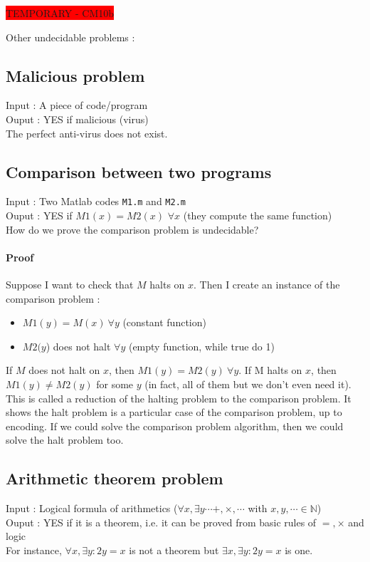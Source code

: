 \colorbox{red}{TEMPORARY - CM10b}

Other undecidable problems :
\subsection{Malicious problem}
Input : A piece of code/program\\
Ouput : YES if malicious (virus)\\
The perfect anti-virus does not exist.

\subsection{Comparison between two programs}
Input : Two Matlab codes \texttt{M1.m} and \texttt{M2.m}\\
Ouput : YES if $M1(x) = M2(x)$ $\forall x$ (they compute the same function)\\
How do we prove the comparison problem is undecidable?
\paragraph{Proof} Suppose I want to check that $M$ halts on $x$. Then I create an instance of the comparison problem : 
\begin{itemize}
\item $M1(y) = M(x) \ \forall y$ (constant function)
\item $M2(y$) does not halt $\forall y$ (empty function, while true do 1)
\end{itemize}
If $M$ does not halt on $x$, then $M1(y) = M2(y) \ \forall y$. If M halts on $x$, then  $M1(y) \neq M2(y)$ for some $y$ (in fact, all of them but we don't even need it).
This is called a reduction of the halting problem to the comparison problem. It shows the halt problem is a particular case of the comparison problem, up to encoding. If we could solve the comparison problem algorithm, then we could solve the halt problem too.

\subsection{Arithmetic theorem problem}
Input : Logical formula of arithmetics ($\forall x, \exists y \cdots +, \times, \cdots$ with $x,y,\cdots \in \mathbb{N}$)\\
Ouput : YES if it is a theorem, i.e. it can be proved from basic rules of $=,\times$ and logic\\
For instance, $\forall x, \exists y : 2y = x$ is not a theorem but  $\exists x, \exists y : 2y = x$ is one.\\

